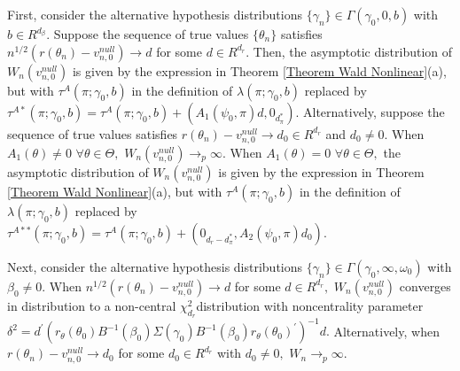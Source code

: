 \documentclass[12pt,thmsb,titlepage,final,oneside,letterpaper]{article}
\begin{document}
First, consider the alternative hypothesis distributions $\{\gamma _{n}\}\in
\Gamma (\gamma _{0},0,b)$ with $b\in R^{d_{\beta }}.$ Suppose the sequence
of true values $\{\theta _{n}\}$ satisfies $n^{1/2}(r(\theta
_{n})-v_{n,0}^{null})\rightarrow d$ for some $d\in R^{d_{r}}.$ Then, the
asymptotic distribution of $W_{n}(v_{n,0}^{null})$ is given by the
expression in Theorem \ref{Theorem Wald Nonlinear}(a), but with $\tau
^{A}(\pi ;\gamma _{0},b)$ in the definition of $\lambda (\pi ;\gamma _{0},b)$
replaced by $\tau ^{A\ast }(\pi ;\gamma _{0},b)=\tau ^{A}(\pi ;\gamma
_{0},b)+(A_{1}(\psi _{0},\pi )d,0_{d_{\pi }^{\ast }}).$ Alternatively,
suppose the sequence of true values satisfies $r(\theta
_{n})-v_{n,0}^{null}\rightarrow d_{0}\in R^{d_{r}}$ and $d_{0}\neq 0.$ When $%
A_{1}(\theta )\neq 0$ $\forall \theta \in \Theta ,$ $W_{n}(v_{n,0}^{null})%
\rightarrow _{p}\infty .$ When $A_{1}(\theta )=0$ $\forall \theta \in \Theta
,$ the asymptotic distribution of $W_{n}(v_{n,0}^{null})$ is given by the
expression in Theorem \ref{Theorem Wald Nonlinear}(a), but with $\tau
^{A}(\pi ;\gamma _{0},b)$ in the definition of $\lambda (\pi ;\gamma _{0},b)$
replaced by $\tau ^{A\ast \ast }(\pi ;\gamma _{0},b)=\tau ^{A}(\pi ;\gamma
_{0},b)+(0_{d_{r}-d_{\pi }^{\ast }},A_{2}(\psi _{0},\pi )d_{0}).$

Next, consider the alternative hypothesis distributions $\{\gamma _{n}\}\in
\Gamma (\gamma _{0},\infty ,\omega _{0})$ with $\beta _{0}\neq 0.$ When $%
n^{1/2}(r(\theta _{n})-v_{n,0}^{null})\rightarrow d$ for some $d\in
R^{d_{r}},$ $W_{n}(v_{n,0}^{null})$ converges in distribution to a
non-central $\chi _{d_{r}}^{2}$distribution with noncentrality parameter $%
\delta ^{2}=d^{\prime }(r_{\theta }(\theta _{0})B^{-1}(\beta
_{0})\allowbreak \Sigma (\gamma _{0})B^{-1}(\beta _{0})r_{\theta }(\theta
_{0})^{\prime })^{-1}d.$ Alternatively, when $r(\theta
_{n})-v_{n,0}^{null}\rightarrow d_{0}$ for some $d_{0}\in R^{d_{r}}$ with $%
d_{0}\neq 0,$ $W_{n}\rightarrow _{p}\infty .$
\end{document}
